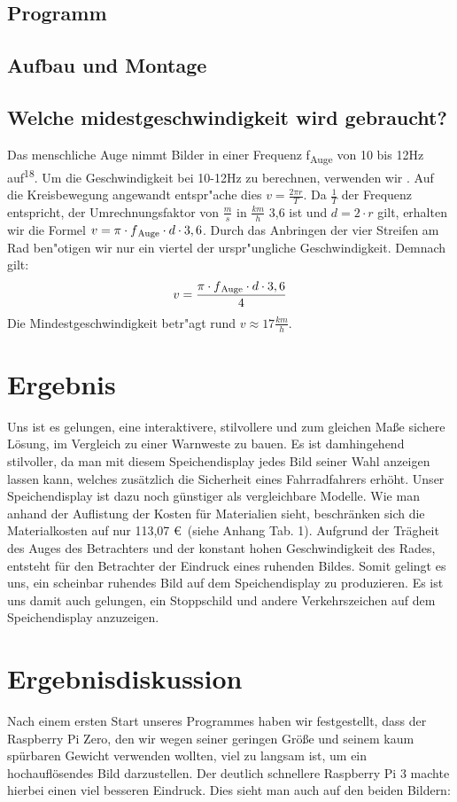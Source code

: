 \documentclass [a4paper, 11pt] {article}
\begin{document}
\subsection{Programm}
\subsection{Aufbau und Montage}
\subsection{Welche midestgeschwindigkeit wird gebraucht?}
Das menschliche Auge nimmt Bilder in einer Frequenz f\textsubscript{Auge} von 10 bis 12Hz auf\textsuperscript{18}. Um die Geschwindigkeit bei 10-12Hz zu berechnen, verwenden wir . Auf die Kreisbewegung angewandt entspr"ache dies $v = \frac{2\pi r}{T}$. Da $\frac{1}{T}$ der Frequenz entspricht, der Umrechnungsfaktor von $\frac{m}{s}$ in $\frac{km}{h}$ 3,6 ist und $d = 2 \cdot r$ gilt, erhalten wir die Formel $v = \pi \cdot f\textsubscript{Auge} \cdot d \cdot 3,6$. Durch das Anbringen der vier Streifen am Rad ben"otigen wir nur ein viertel der urspr"ungliche Geschwindigkeit. Demnach gilt: 
\begin{align}
v = \frac{\pi \cdot f\textsubscript{Auge} \cdot d \cdot 3,6}{4}
\end{align}
Die Mindestgeschwindigkeit betr"agt rund $v \approx 17\frac{km}{h}$.
\section{Ergebnis}
Uns ist es gelungen, eine interaktivere, stilvollere und zum gleichen Maße sichere Lösung, im Vergleich zu einer Warnweste zu bauen. Es ist damhingehend stilvoller, da man mit diesem Speichendisplay jedes Bild seiner Wahl anzeigen lassen kann, welches zusätzlich die Sicherheit eines Fahrradfahrers erhöht.
Unser Speichendisplay ist dazu noch günstiger als vergleichbare Modelle. Wie man anhand der Auflistung der Kosten für Materialien sieht, beschränken sich die Materialkosten auf nur 113,07 \euro\ (siehe Anhang Tab. 1). Aufgrund der Trägheit des Auges des Betrachters und der konstant hohen Geschwindigkeit des Rades, entsteht für den Betrachter der Eindruck eines ruhenden Bildes. Somit gelingt es uns, ein scheinbar ruhendes Bild auf dem Speichendisplay zu produzieren. Es ist uns damit auch gelungen, ein Stoppschild und andere Verkehrszeichen auf dem Speichendisplay anzuzeigen.
\section{Ergebnisdiskussion}
Nach einem ersten Start unseres Programmes haben wir festgestellt, dass der Raspberry Pi Zero, den wir wegen seiner geringen Größe und seinem kaum spürbaren Gewicht verwenden wollten, viel zu langsam ist, um ein hochauflösendes Bild darzustellen. Der deutlich schnellere Raspberry Pi 3 machte hierbei einen viel besseren Eindruck. Dies sieht man auch auf den beiden Bildern:
\end{document}
